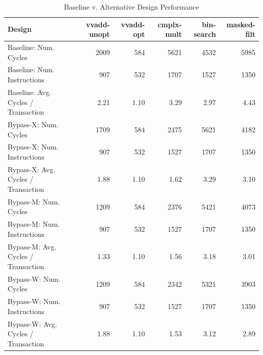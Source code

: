 \documentclass[10pt]{article}
\begin{document}
\begin{center}
\begin{table}[h]
\begin{tabular} {|l | r | r | r | r | r |}

\hline
\textbf{Design}    & \textbf{vvadd-unopt} & \textbf{vvadd-opt} & \textbf{cmplx-mult} & \textbf{bin-search} & \textbf{masked-filt} \\
\hline
Baseline:    Num. Cycles                 &    2009    &   584    &   5621   &  4532	&	5985					\\
Baseline: 	 Num. Instructions           &      907      &   532    &   1707   & 1527 &	1350					\\
Baseline:    Avg. Cycles / Transaction    &    2.21    &  1.10     &  3.29    & 2.97	&	4.43					\\

Bypass-X: Num. Cycles                 &    1709    &   584    &  2475    & 5621	&		4182				\\
Bypass-X: Num. Instructions           &      907      &    532   &   1527   & 1707 &		1350				\\
Bypass-X: Avg. Cycles / Transaction    &     1.88   &    1.10   &   1.62   & 3.29	&	3.10				    \\

Bypass-M: Num. Cycles                 &    1209    &   584    &  2376    & 5421	&		4073				\\
Bypass-M: Num. Instructions           &      907      &    532   &   1527   & 1707 &		1350				\\
Bypass-M: Avg. Cycles / Transaction    &     1.33   &    1.10   &   1.56   & 3.18	&	3.01				    \\

Bypass-W: Num. Cycles                 &    1209    &   584    &  2342    & 5321	&		3903				\\
Bypass-W: Num. Instructions           &      907      &    532   &   1527   & 1707 &		1350				\\
Bypass-W: Avg. Cycles / Transaction    &     1.88   &    1.10   &   1.53   & 3.12	&	2.89				    \\
\hline                    
\end{tabular}
\caption{Baseline v. Alternative Design Performance}
\label{tab:cycles}
\end{table}
\end{center}

\pagebreak[4]

\end{document}
